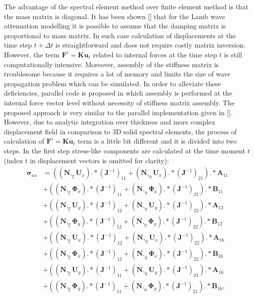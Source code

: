 \documentclass[preprint,12pt]{elsarticle}
\renewcommand{\vec}[1]{\mathbf{#1}}
\renewcommand{\bm}[1]{\mathbf{#1}}
\newcommand{\bs}[1]{\boldsymbol{#1}}
\begin{document}
	The advantage of the spectral element method over finite element method is that the mass matrix is diagonal. It has been shown [] that for the Lamb wave attenuation modelling it is possible to assume that the damping matrix is proportional to mass matrix. In such case calculation of displacements at the time step $t + \Delta t$ is straightforward and does not require costly matrix inversion. However, the term $\vec{F}^i=\bm{K}\vec{u}_t$ related to internal forces at the time step $t$ is still computationally intensive. Moreover, assembly of the stiffness matrix is troublesome because it requires a lot of memory and limits the size of wave propagation problem which can be simulated. In order to alleviate these deficiencies, parallel code is proposed in which assembly is performed at the internal force vector level without necessity of stiffness matrix assembly. The proposed approach is very similar to the parallel implementation given in []. However, due to analytic integration over thickness and more complex displacement field in comparison to 3D solid spectral elements, the process of calculation of $\vec{F}^i=\bm{K}\vec{u}_t$ term is a little bit different and it is divided into two steps. In the first step stress-like components are calculated at the time moment $t$ (index $t$ in displacement vectors is omitted for clarity):
	\begin{equation}
	\begin{split}
	\bs{\sigma}_{xx}&=\left((\bm{N},_{\xi}\vec{U}_x).*(\vec{J}^{-1})_{11}+(\bm{N},_{\eta}\vec{U}_x).*(\vec{J}^{-1})_{21}\right).*\vec{A}_{11}\\
	&+\left((\bm{N},_{\xi}\bs{\Phi}_x).*(\vec{J}^{-1})_{11}+(\bm{N},_{\eta}\bs{\Phi}_x).*(\vec{J}^{-1})_{21}\right).*\vec{B}_{11}\\
	&+\left((\bm{N},_{\xi}\vec{U}_y).*(\vec{J}^{-1})_{12}+(\bm{N},_{\eta}\vec{U}_y).*(\vec{J}^{-1})_{22}\right).*\vec{A}_{12}\\
	&+\left((\bm{N},_{\xi}\bs{\Phi}_y).*(\vec{J}^{-1})_{12}+(\bm{N},_{\eta}\bs{\Phi}_y).*(\vec{J}^{-1})_{22}\right).*\vec{B}_{12}\\
	&+\left((\bm{N},_{\xi}\vec{U}_x).*(\vec{J}^{-1})_{12}+(\bm{N},_{\eta}\vec{U}_x).*(\vec{J}^{-1})_{22}\right).*\vec{A}_{16}\\
	&+\left((\bm{N},_{\xi}\bs{\Phi}_x).*(\vec{J}^{-1})_{12}+(\bm{N},_{\eta}\bs{\Phi}_x).*(\vec{J}^{-1})_{22}\right).*\vec{B}_{16}\\
	&+\left((\bm{N},_{\xi}\vec{U}_y).*(\vec{J}^{-1})_{11}+(\bm{N},_{\eta}\vec{U}_y).*(\vec{J}^{-1})_{21}\right).*\vec{A}_{16}\\
	&+\left((\bm{N},_{\xi}\bs{\Phi}_y).*(\vec{J}^{-1})_{11}+(\bm{N},_{\eta}\bs{\Phi}_y).*(\vec{J}^{-1})_{21}\right).*\vec{B}_{16},
	\end{split}
	\end{equation}
\end{document}
